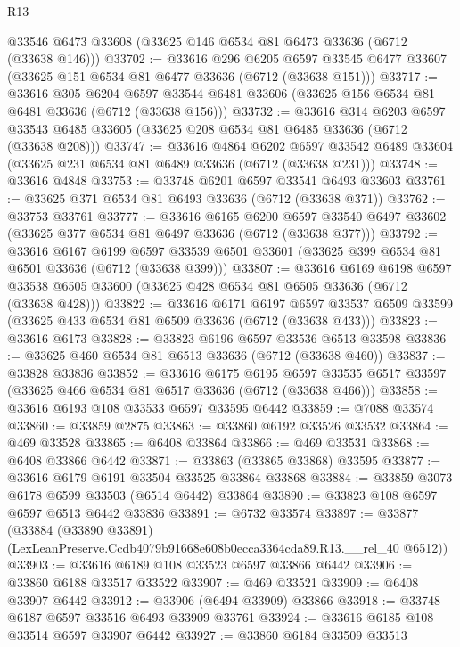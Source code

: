 \begin{lexlean}{R13}
\begin{coremodule}
    @33546
    @6473
    @33608
    (@33625 @146 @6534 @81 @6473 @33636 (@6712 (@33638 @146)))
@33702 := @33616
    @296
    @6205
    @6597
    @33545
    @6477
    @33607
    (@33625 @151 @6534 @81 @6477 @33636 (@6712 (@33638 @151)))
@33717 := @33616
    @305
    @6204
    @6597
    @33544
    @6481
    @33606
    (@33625 @156 @6534 @81 @6481 @33636 (@6712 (@33638 @156)))
@33732 := @33616
    @314
    @6203
    @6597
    @33543
    @6485
    @33605
    (@33625 @208 @6534 @81 @6485 @33636 (@6712 (@33638 @208)))
@33747 := @33616
    @4864
    @6202
    @6597
    @33542
    @6489
    @33604
    (@33625 @231 @6534 @81 @6489 @33636 (@6712 (@33638 @231)))
@33748 := @33616 @4848
@33753 := @33748 @6201 @6597 @33541 @6493 @33603
@33761 := @33625 @371 @6534 @81 @6493 @33636 (@6712 (@33638 @371))
@33762 := @33753 @33761
@33777 := @33616
    @6165
    @6200
    @6597
    @33540
    @6497
    @33602
    (@33625 @377 @6534 @81 @6497 @33636 (@6712 (@33638 @377)))
@33792 := @33616
    @6167
    @6199
    @6597
    @33539
    @6501
    @33601
    (@33625 @399 @6534 @81 @6501 @33636 (@6712 (@33638 @399)))
@33807 := @33616
    @6169
    @6198
    @6597
    @33538
    @6505
    @33600
    (@33625 @428 @6534 @81 @6505 @33636 (@6712 (@33638 @428)))
@33822 := @33616
    @6171
    @6197
    @6597
    @33537
    @6509
    @33599
    (@33625 @433 @6534 @81 @6509 @33636 (@6712 (@33638 @433)))
@33823 := @33616 @6173
@33828 := @33823 @6196 @6597 @33536 @6513 @33598
@33836 := @33625 @460 @6534 @81 @6513 @33636 (@6712 (@33638 @460))
@33837 := @33828 @33836
@33852 := @33616
    @6175
    @6195
    @6597
    @33535
    @6517
    @33597
    (@33625 @466 @6534 @81 @6517 @33636 (@6712 (@33638 @466)))
@33858 := @33616 @6193 @108 @33533 @6597 @33595 @6442
@33859 := @7088 @33574
@33860 := @33859 @2875
@33863 := @33860 @6192 @33526 @33532
@33864 := @469 @33528
@33865 := @6408 @33864
@33866 := @469 @33531
@33868 := @6408 @33866 @6442
@33871 := @33863 (@33865 @33868) @33595
@33877 := @33616 @6179 @6191 @33504 @33525 @33864 @33868
@33884 := @33859 @3073 @6178 @6599 @33503 (@6514 @6442) @33864
@33890 := @33823 @108 @6597 @6597 @6513 @6442 @33836
@33891 := @6732 @33574
@33897 := @33877
    (@33884 (@33890 @33891) (LexLeanPreserve.Ccdb4079b91668e608b0ecca3364cda89.R13.__rel_40 @6512))
@33903 := @33616 @6189 @108 @33523 @6597 @33866 @6442
@33906 := @33860 @6188 @33517 @33522
@33907 := @469 @33521
@33909 := @6408 @33907 @6442
@33912 := @33906 (@6494 @33909) @33866
@33918 := @33748 @6187 @6597 @33516 @6493 @33909 @33761
@33924 := @33616 @6185 @108 @33514 @6597 @33907 @6442
@33927 := @33860 @6184 @33509 @33513

\end{coremodule}
\end{lexlean}
